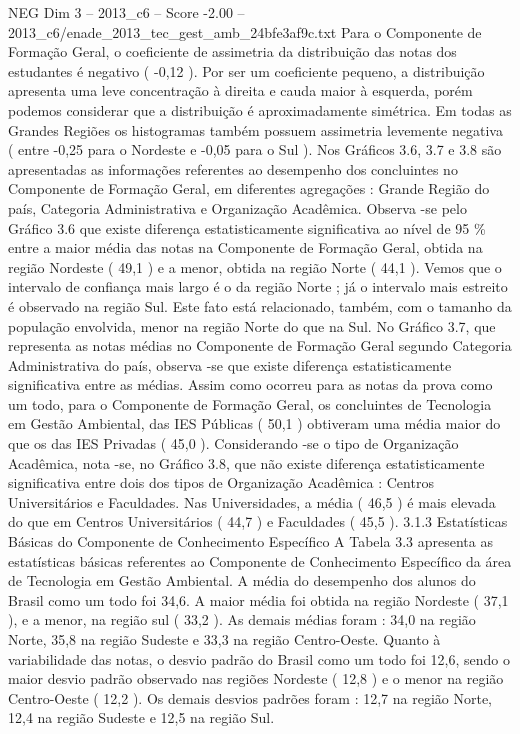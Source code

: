 \begin{textsample}{NEG Dim 3 – 2013\_c6 – Score -2.00 – 2013\_c6/enade\_2013\_tec\_gest\_amb\_24bfe3af9c.txt}
Para o Componente de Formação Geral, o coeficiente de assimetria da distribuição das notas dos estudantes é negativo ( -0,12 ).
Por ser um coeficiente pequeno, a distribuição apresenta uma leve concentração à direita e cauda maior à esquerda, porém podemos considerar que a distribuição é aproximadamente simétrica.
Em todas as Grandes Regiões os histogramas também possuem assimetria levemente negativa ( entre -0,25 para o Nordeste e -0,05 para o Sul ).
Nos Gráficos 3.6, 3.7 e 3.8 são apresentadas as informações referentes ao desempenho dos concluintes no Componente de Formação Geral, em diferentes agregações : Grande Região do país, Categoria Administrativa e Organização Acadêmica.
Observa -se pelo Gráfico 3.6 que existe diferença estatisticamente significativa ao nível de 95 \% entre a maior média das notas na Componente de Formação Geral, obtida na região Nordeste ( 49,1 ) e a menor, obtida na região Norte ( 44,1 ).
Vemos que o intervalo de confiança mais largo é o da região Norte ; já o intervalo mais estreito é observado na região Sul.
Este fato está relacionado, também, com o tamanho da população envolvida, menor na região Norte do que na Sul.
No Gráfico 3.7, que representa as notas médias no Componente de Formação Geral segundo Categoria Administrativa do país, observa -se que existe diferença estatisticamente significativa entre as médias.
Assim como ocorreu para as notas da prova como um todo, para o Componente de Formação Geral, os concluintes de Tecnologia em Gestão Ambiental, das IES Públicas ( 50,1 ) obtiveram uma média maior do que os das IES Privadas ( 45,0 ).
Considerando -se o tipo de Organização Acadêmica, nota -se, no Gráfico 3.8, que não existe diferença estatisticamente significativa entre dois dos tipos de Organização Acadêmica : Centros Universitários e Faculdades.
Nas Universidades, a média ( 46,5 ) é mais elevada do que em Centros Universitários ( 44,7 ) e Faculdades ( 45,5 ). 3.1.3 Estatísticas Básicas do Componente de Conhecimento Específico A Tabela 3.3 apresenta as estatísticas básicas referentes ao Componente de Conhecimento Específico da área de Tecnologia em Gestão Ambiental.
A média do desempenho dos alunos do Brasil como um todo foi 34,6.
A maior média foi obtida na região Nordeste ( 37,1 ), e a menor, na região sul ( 33,2 ).
As demais médias foram : 34,0 na região Norte, 35,8 na região Sudeste e 33,3 na região Centro-Oeste.
Quanto à variabilidade das notas, o desvio padrão do Brasil como um todo foi 12,6, sendo o maior desvio padrão observado nas regiões Nordeste ( 12,8 ) e o menor na região Centro-Oeste ( 12,2 ).
Os demais desvios padrões foram : 12,7 na região Norte, 12,4 na região Sudeste e 12,5 na região Sul.

\end{textsample}
